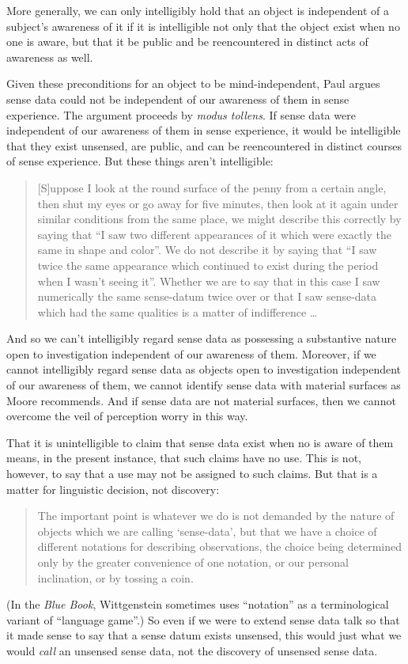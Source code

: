 \documentclass[11pt]{article}
\begin{document}
More generally, we can only intelligibly hold that an object is independent of a subject's awareness of it if it is intelligible not only that the object exist when no one is aware, but that it be public and be reencountered in distinct acts of awareness as well.

Given these preconditions for an object to be mind-independent, Paul argues sense data could not be independent of our awareness of them in sense experience. The argument proceeds by \emph{modus tollens}. If sense data were independent of our awareness of them in sense experience, it would be intelligible that they exist unsensed, are public, and can be reencountered in distinct courses of sense experience. But these things aren't intelligible:  
\begin{quote}
    [S]uppose I look at the round surface of the penny from a certain angle, then shut my eyes or go away for five minutes, then look at it again under similar conditions from the same place, we might describe this correctly by saying that ``I saw two different appearances of it which were exactly the same in shape and color''. We do not describe it by saying that ``I saw twice the same appearance which continued to exist during the period when I wasn't seeing it''. Whether we are to say that in this case I saw numerically the same sense-datum twice over or that I saw sense-data which had the same qualities is a matter of indifference \ldots\
\end{quote}
And so we can't intelligibly regard sense data as possessing a substantive nature open to investigation independent of our awareness of them. Moreover, if we cannot intelligibly regard sense data as objects open to investigation independent of our awareness of them, we cannot identify sense data with material surfaces as Moore recommends. And if sense data are not material surfaces, then we cannot overcome the veil of perception worry in this way.

That it is unintelligible to claim that sense data exist when no is aware of them means, in the present instance, that such claims have no use. This is not, however, to say that a use may not be assigned to such claims. But that is a matter for linguistic decision, not discovery:
\begin{quote}
    The important point is whatever we do is not demanded by the nature of objects which we are calling `sense-data', but that we have a choice of different notations for describing observations, the choice being determined only by the greater convenience of one notation, or our personal inclination, or by tossing a coin.
\end{quote}
(In the \emph{Blue Book}, Wittgenstein sometimes uses ``notation'' as a terminological variant of ``language game''.) So even if we were to extend sense data talk so that it made sense to say that a sense datum exists unsensed, this would just what we would \emph{call} an unsensed sense data, not the discovery of unsensed sense data.
\end{document}
